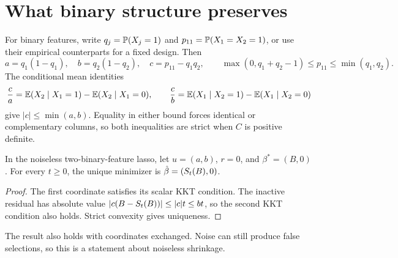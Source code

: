 \section{What binary structure preserves}

For binary features, write $q_j = \mathbb{P}(X_j = 1)$ and
$p_{11} = \mathbb{P}(X_1 = X_2 = 1)$, or use their empirical counterparts for a fixed
design. Then
\[
 a = q_1(1 - q_1),\quad b
   = q_2(1 - q_2),\quad c
   = p_{11} - q_1q_2, \qquad \max(0,q_1 + q_2 - 1)
   \le p_{11}
   \le \min(q_1,q_2).
\]
The conditional mean identities
\begin{equation}
 \label{eq:conditional-differences}
 \frac ca = \mathbb{E}(X_2 \mid X_1 = 1) - \mathbb{E}(X_2 \mid X_1 = 0),\qquad \frac cb
          = \mathbb{E}(X_1 \mid X_2 = 1) - \mathbb{E}(X_1 \mid X_2 = 0)
\end{equation}
give $|c| \le \min(a,b)$. Equality in either bound forces identical or
complementary columns, so both inequalities are strict when $C$ is positive
definite.

\begin{theorem}
 \label{thm:single}
 In the noiseless two-binary-feature lasso, let $u = (a,b)$, $r = 0$, and
 $\beta^* = (B,0)$. For every $t \ge 0$, the unique minimizer is
 $\hat\beta = (S_t(B),0)$.
\end{theorem}
\begin{proof}
 The first coordinate satisfies its scalar KKT condition. The inactive residual
 has absolute value $|c(B - S_t(B))| \le |c|t \le bt$, so the second KKT
 condition also holds. Strict convexity gives uniqueness.
\end{proof}
The result also holds with coordinates exchanged. Noise can still produce false
selections, so this is a statement about noiseless shrinkage.

